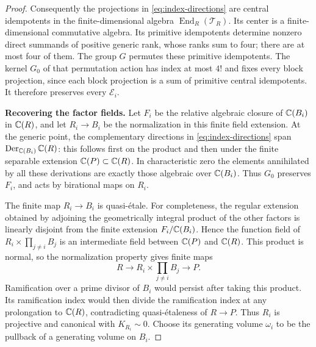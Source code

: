 \begin{proof}
Consequently the projections in \eqref{eq:index-directions} are central
idempotents in the finite-dimensional algebra
\(\operatorname{End}_R(\mathcal T_R)\).  Its center is a finite-dimensional
commutative algebra.  Its primitive idempotents determine nonzero direct
summands of positive generic rank, whose ranks sum to four; there are at
most four of them.  The group \(G\) permutes these primitive idempotents.
The kernel \(G_0\) of that permutation action has index at most \(4!\) and
fixes every block projection, since each block projection is a sum of
primitive central idempotents.  It therefore preserves every
\(\mathcal E_i\).

\smallskip\noindent\textbf{Recovering the factor fields.}
Let \(F_i\) be the relative algebraic closure of \(\mathbb C(B_i)\) in \(\mathbb C(R)\),
and let \(R_i\to B_i\) be the normalization in this finite field extension.
At the generic point, the complementary directions in
\eqref{eq:index-directions} span
\(\operatorname{Der}_{\mathbb C(B_i)}\mathbb C(R)\): this follows first on the product
and then under the finite separable extension \(\mathbb C(P)\subset\mathbb C(R)\).
In characteristic zero the elements annihilated by all these derivations
are exactly those algebraic over \(\mathbb C(B_i)\).  Thus \(G_0\) preserves
\(F_i\), and acts by birational maps on \(R_i\).

The finite map \(R_i\to B_i\) is quasi-\'etale.  For completeness, the
regular extension obtained by adjoining the geometrically integral
product of the other factors is
linearly disjoint from the finite extension \(F_i/\mathbb C(B_i)\).  Hence the
function field of
\(R_i\times\prod_{j\ne i}B_j\) is an intermediate field between
\(\mathbb C(P)\) and \(\mathbb C(R)\).  This product is normal, so the normalization
property gives finite maps
\[
 R\longrightarrow R_i\times\prod_{j\ne i}B_j
       \longrightarrow P.
\]
Ramification over a prime divisor of \(B_i\) would persist after taking this
product.  Its ramification index would then divide the ramification index
at any prolongation to \(\mathbb C(R)\), contradicting quasi-\'etaleness of
\(R\to P\).  Thus \(R_i\) is projective and canonical with
\(K_{R_i}\sim0\).  Choose its generating volume \(\omega_i\) to be the
pullback of a generating volume on \(B_i\).


\end{proof}
